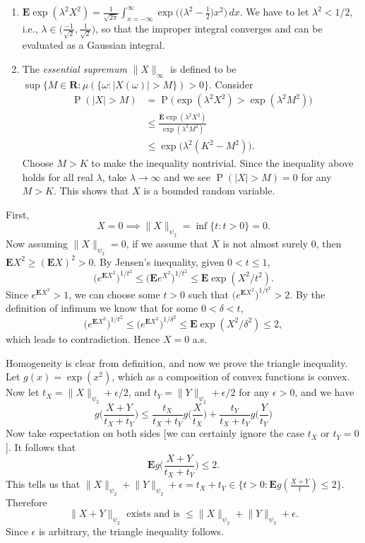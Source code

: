 \documentclass[11pt]{article}
\newcommand{\R}{\mathbf{R}}
\newcommand{\nm}[1]{\lVert #1 \rVert}
\newcommand{\abs}[1]{\lvert #1 \rvert}
\renewcommand{\Pr}{\operatorname{P}}
\newcommand{\E}{\mathbf{E}}
\newcommand{\df}[1]{\textit{\textsf{#1}}} %
\theoremstyle{plain}
\theoremstyle{definition}
\theoremstyle{remark}
\theoremstyle{definition}
\newenvironment{mansol}[1]{%
  \renewcommand\themansolinner{#1}%
  \mansolinner
}{\endmansolinner}
\begin{document}
\begin{mansol}{2.5.5}
    \begin{enumerate}[label=(\alph*)]
        \item $\E \exp(\lambda^2 X^2) = \frac{1}{\sqrt{2\pi}}\int_{x = -\infty}^\infty \exp\bigl(\bigl(\lambda^2 -\frac 1 2\bigr) x^2\bigr)\,dx$. We have to let $\lambda^2 < 1/2$, i.e., $\lambda \in \bigl(\frac{-1}{\sqrt{2}}, \frac{1}{\sqrt{2}}\bigr)$, so that the improper integral converges and can be evaluated as a Gaussian integral.
        \item The \df{essential supremum} $\nm{X}_\infty$ is defined to be $\sup\{M \in \R : \mu(\{\omega : \abs{X(\omega)} > M\}) > 0\}$. Consider \begin{align*}
            \Pr (\abs{X} > M) & = \Pr\bigl(\exp(\lambda^2 X^2) > \exp(\lambda^2 M^2)\bigr) \\
            & \leq \frac{\E \exp(\lambda^2 X^2)}{\exp(\lambda^2 M^2)} \\
            & \leq \exp\bigl(\lambda^2(K^2 - M^2)\bigr).
        \end{align*}
        Choose $M > K$ to make the inequality nontrivial. Since the inequality above holds for all real $\lambda$, take $\lambda \to \infty$ and we see $\Pr(\abs{X} > M) = 0$ for any $M > K$. This shows that $X$ is a bounded random variable.
    \end{enumerate}
\end{mansol}

\begin{mansol}{2.5.7}
    First, \[X = 0 \implies \nm{X}_{\psi_2} = \inf\{t:t>0\} = 0.\] Now assuming $\nm{X}_{\psi_2} = 0$, if we assume that $X$ is not almost surely 0, then $\E X^2 \geq (\E X)^2 > 0$. By Jensen's inequality, given $0<t\leq 1$, \[
    \bigl(e^{\E X^2}\bigr)^{1/t^2} \leq \bigl(\E e^{X^2}\bigr)^{1/t^2} \leq \E \exp(X^2 / t^2).
    \]
    Since $e^{\E X^2} > 1$, we can choose some $t > 0$ such that $\bigl(e^{\E X^2}\bigr)^{1/t^2} > 2$. By the definition of infimum we know that for some $0 < \delta < t$, \[
         \bigl(e^{\E X^2}\bigr)^{1/t^2} \leq \bigl(e^{\E X^2}\bigr)^{1/\delta^2} \leq \E \exp(X^2 / \delta^2) \leq 2,
    \]
    which leads to contradiction. Hence $X = 0$ a.s.

    Homogeneity is clear from definition, and now we prove the triangle inequality. Let $g(x) = \exp(x^2)$, which as a composition of convex functions is convex. Now let $t_X = \nm{X}_{\psi_2} + \epsilon/2$, and $t_Y = \nm{Y}_{\psi_2} + \epsilon/2$ for any $\epsilon > 0$, and we have \[
        g \biggl(\frac{X+Y}{t_X + t_Y}\biggr) \leq \frac{t_X}{t_X + t_Y} g\biggl(\frac{X}{t_X}\biggr) + \frac{t_Y}{t_X + t_Y} g\biggl(\frac{Y}{t_Y}\biggr)
    \]
    Now take expectation on both sides [we can certainly ignore the case $t_X$ or $t_Y = 0$]. It follows that \[\E g \biggl(\frac{X+Y}{t_X + t_Y}\biggr) \leq 2.\]
    This tells us that $\nm{X}_{\psi_2} + \nm{Y}_{\psi_2} + \epsilon = t_X + t_Y \in \{t>0 : \E g(\frac{X+Y}{t}) \leq 2\}$. Therefore \[
        \nm{X+Y}_{\psi_2} \text{ exists and is } \leq \nm{X}_{\psi_2} + \nm{Y}_{\psi_2} + \epsilon.
    \]
    Since $\epsilon$ is arbitrary, the triangle inequality follows.
\end{mansol}
\end{document}
